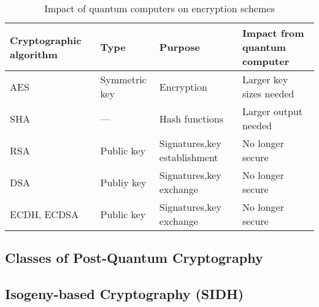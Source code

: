 \begin{table}[htpb]
  \caption[Impact of quantum computers on encryption schemes]{Impact of quantum computers on encryption schemes}\label{tab:impact}
  \centering
  \begin{tabular}{|p{3cm}|p{3cm}|p{3cm}|p{5cm}|}
	\hline
    \rowcolor{lightgray!50}
      \textbf{Cryptographic} \newline \textbf{algorithm} & \textbf{Type} & \textbf{Purpose} & \textbf{Impact from} \newline \textbf{ quantum computer} \\
	\hline
      AES & Symmetric key & Encryption & Larger key sizes needed \\
    \hline
      SHA & --- & Hash functions & Larger output needed \\
    \hline
      RSA & Public key & Signatures,\newline key establishment & No longer secure \\
	\hline      
      DSA & Publiy key & Signatures,\newline key exchange & No longer secure \\
    \hline
      ECDH, ECDSA & Public key & Signatures,\newline key exchange & No longer secure \\
    \hline
  \end{tabular}
\end{table}
\subsection{Classes of Post-Quantum Cryptography}
\subsection{Isogeny-based Cryptography (SIDH)}

